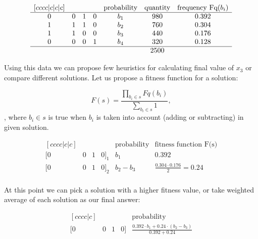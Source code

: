 \begin{equation}
\begin{matrix}[cccc|c|c|c]
     &  &  &  & \mbox{probability} & \mbox{quantity} & \mbox{frequency Fq($b_i$)} \\
    \hline
    0 & 0 & 1 & 0 & b_1 & 980 & 0.392 \\
    1 & 1 & 1 & 0 & b_2 & 760 & 0.304 \\ 
    1 & 1 & 0 & 0 & b_3 & 440 & 0.176 \\ 
    0 & 0 & 0 & 1 & b_4 & 320 & 0.128 \\ 
    \hline
     &  &  &  &  & 2500 & \\ 
\end{matrix}
\end{equation}

Using this data we can propose few heuristics for calculating final value of $x_3$ or compare different solutions.
Let us propose a fitness function for a solution:

\begin{equation}
    F(s) = \frac{\displaystyle\prod_{b_{i} \in s} Fq(b_i)}{ \displaystyle\sum_{b_i \in s}1},
\end{equation},
where $b_i \in s$ is true when $b_i$ is taken into account (adding or subtracting) in given solution.

\begin{equation}
\begin{matrix}[cccc|c|c]
     &  &  &  & \mbox{probability} & \mbox{fitness function F(s)} \\
    \hline
    [0 & 0 & 1 & 0]_1 & b_1 & 0.392 \\
    [0 & 0 & 1 & 0]_2 & b_2 - b_3 & \frac{0.304 \cdot 0.176}{2} = 0.24 \\ 
\end{matrix}
\end{equation}

At this point we can pick a solution with a higher fitness value, or take weighted average of each solution as our final answer:

\begin{equation}
\begin{matrix}[cccc|c]
     &  &  &  & \mbox{probability}\\
    \hline
    [0 & 0 & 1 & 0] & \frac{0.392 \cdot b_1 + 0.24 \cdot (b_2 - b_3)}{0.392+0.24}\\
\end{matrix}
\end{equation}



